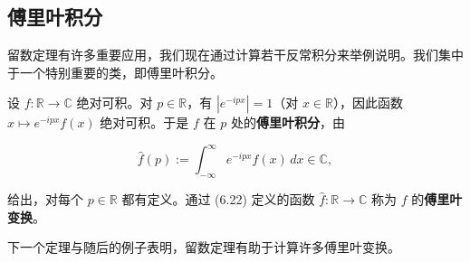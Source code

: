 \subsection*{傅里叶积分}

留数定理有许多重要应用，我们现在通过计算若干反常积分来举例说明。我们集中于一个特别重要的类，即傅里叶积分。

设 $ f : \mathbb{R} \to \mathbb{C} $ 绝对可积。对 $ p \in \mathbb{R} $，有 $ |e^{-ipx}| = 1 $（对 $ x \in \mathbb{R} $），因此函数 $ x \mapsto e^{-ipx}f(x) $ 绝对可积。于是 $ f $ 在 $ p $ 处的\textbf{傅里叶积分}，由

\begin{equation}
\widehat{f}(p) := \int_{-\infty}^{\infty}e^{-ipx}f(x)\,dx \in \mathbb{C} ,\tag{6.22}
\end{equation}

给出，对每个 $ p \in \mathbb{R} $ 都有定义。通过 (6.22) 定义的函数 $ \widehat{f} : \mathbb{R} \to \mathbb{C} $ 称为 $ f $ 的\textbf{傅里叶变换}。

下一个定理与随后的例子表明，留数定理有助于计算许多傅里叶变换。

